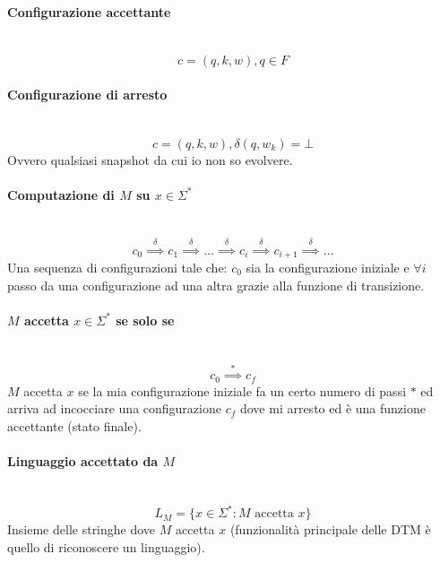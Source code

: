\documentclass{article}
\begin{document}
\paragraph{Configurazione accettante}\mbox{}\\
$$c=(q,k,w),q\in F$$

\paragraph{Configurazione di arresto}\mbox{}\\
$$c=(q,k,w),\delta(q,w_k)=\bot$$
Ovvero qualsiasi snapshot da cui io non so evolvere.
\paragraph{Computazione di $M$ su $x\in\Sigma^*$}\mbox{}\\
$$c_0\overset{\delta}{\implies}c_1\overset{\delta}{\implies}\dots\overset{\delta}{\implies}
    c_i\overset{\delta}{\implies}c_{i+1}\overset{\delta}{\implies}\dots$$
Una sequenza di configurazioni tale che: $c_0$ sia la configurazione iniziale e $\forall i$
passo da una configurazione ad una altra grazie alla funzione di transizione.

\paragraph{$M$ accetta $x\in\Sigma^*$ se solo se}\mbox{}\\
$$c_0\overset{*}{\implies}c_f$$
$M$ accetta $x$ se la mia configurazione iniziale fa un certo numero di passi $*$ ed
arriva ad incocciare una configurazione $c_f$ dove mi arresto ed è una funzione accettante
(stato finale).

\paragraph{Linguaggio accettato da $M$}\mbox{}\\
$$L_M=\{x\in\Sigma^*:M\text{ accetta }x\}$$
Insieme delle stringhe dove $M$ accetta $x$ (funzionalità principale delle DTM è quello
di riconoscere un linguaggio).
\end{document}
